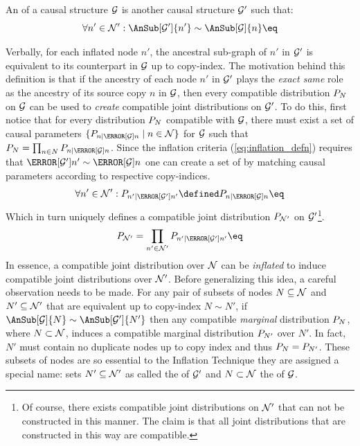 \documentclass[aps, 10pt, english, twoside, pra, nofootinbib, tightenlines, longbibliography, superscriptaddress]{revtex4-1}
\begin{document}
    \begin{definition}
        An  of a causal structure $\mathcal{G}$ is another causal structure $\mathcal{G}'$ such that:
        \[ \forall n' \in \nodes': \AnSub[\graph']{n'} \sim \AnSub[\graph]{n} \eq \label{eq:inflation_defn}\]
    \end{definition}
    Verbally, for each inflated node $n'$, the ancestral sub-graph of $n'$ in $\mathcal{G}'$ is equivalent to its counterpart in $\mathcal{G}$ up to copy-index. The motivation behind this definition is that if the ancestry of each node $n'$ in $\mathcal{G}'$ plays the \textit{exact same} role as the ancestry of its source copy $n$ in $\mathcal{G}$, then every compatible distribution $\prob[N]$ on $\mathcal{G}$ can be used to \textit{create} compatible joint distributions on $\mathcal{G}'$. To do this, first notice that for every distribution $\prob[N]$ compatible with $\mathcal{G}$, there must exist a set of causal parameters $\{\prob[n\mid \Pa[\graph]{n}] \mid n \in \nodes\}$ for $\mathcal{G}$ such that $\prob[N] = \prod_{n \in N} \prob[n\mid \Pa[\graph]{n}]$. Since the inflation criteria (\cref{eq:inflation_defn}) requires that $\Pa[\graph']{n'} \sim \Pa[\graph]{n}$ one can create a set of  by matching causal parameters according to respective copy-indices.
    \[ \forall n' \in \nodes' : \prob[n'\mid \Pa[\graph']{n'}] \defined \prob[n\mid \Pa[\graph]{n}] \eq \label{eq:inflated_causal_parameters} \]
    Which in turn uniquely defines a compatible joint distribution $\prob[\nodes']$ on $\mathcal{G}'$\footnote{Of course, there exists compatible joint distributions on $\mathcal{N}'$ that can not be constructed in this manner. The claim is that all joint distributions that are constructed in this way are compatible.}.
    \[ \prob[\nodes'] = \prod_{n' \in \nodes'} \prob[n'\mid \Pa[\graph']{n'}] \eq \label{eq:unique_causal_parameters_inflated}\]
    In essence, a compatible joint distribution over $\mathcal{N}$ can be \textit{inflated} to induce compatible joint distributions over $\mathcal{N}'$. Before generalizing this idea, a careful observation needs to be made. For any pair of subsets of nodes $N \subseteq \mathcal{N}$ and $N' \subseteq \mathcal{N}'$ that are equivalent up to copy-index $N \sim N'$, if $\AnSub[\graph]{N} \sim \AnSub[\graph']{N'}$ then any compatible \textit{marginal} distribution $\prob[N]$, where $N \subset \mathcal{N}$, induces a compatible marginal distribution $\prob[N']$ over $N'$. In fact, $N'$ must contain no duplicate nodes up to copy index and thus $\prob[N] = \prob[N']$. These subsets of nodes are so essential to the Inflation Technique they are assigned a special name: sets $N' \subseteq \mathcal{N}'$ as called the  of $\mathcal{G}'$ and $N \subset \mathcal{N}$ the  of $\mathcal{G}$.
\end{document}
